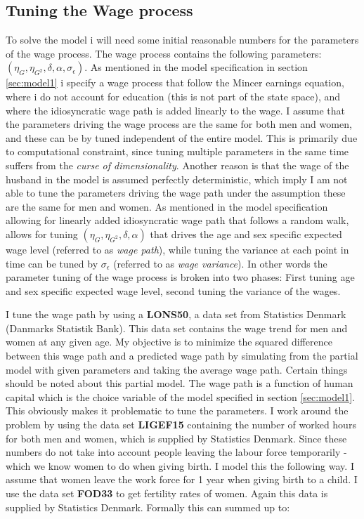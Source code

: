 \subsection{Tuning the Wage process}

To solve the model i will need some initial reasonable numbers for the parameters of the wage process. The wage process contains the following parameters: $(\eta_G, \eta_{G^2}, \delta, \alpha, \sigma_{\epsilon})$. As mentioned in the model specification in section \ref{sec:model1} i specify a wage process that follow the Mincer earnings equation, where i do not account for education (this is not part of the state space), and where the idiosyncratic wage path is added linearly to the wage. I assume that the parameters driving the wage process are the same for both men and women, and these can be by tuned independent of the entire model. This is primarily due to computational constraint, since tuning multiple parameters in the same time suffers from the \textit{curse of dimensionality}. Another reason is that the wage of the husband in the model is assumed perfectly deterministic, which imply I am not able to tune the parameters driving the wage path under the assumption these are the same for men and women. As mentioned in the model specification allowing for linearly added idiosyncratic wage path that follows a random walk, allows for tuning $(\eta_G, \eta_{G^2}, \delta, \alpha)$ that drives the age and sex specific expected wage level (referred to as \textit{wage path}), while tuning the variance at each point in time can be tuned by $\sigma_\epsilon$ (referred to as \textit{wage variance}). In other words the parameter tuning of the wage process is broken into two phases: First tuning age and sex specific expected wage level, second tuning the variance of the wages.

I tune the wage path by using a \textbf{LONS50}, a data set from Statistics Denmark (Danmarks Statistik Bank). This data set contains the wage trend for men and women at any given age. My objective is to minimize the squared difference between this wage path and a predicted wage path by simulating from the partial model with given parameters and taking the average wage path. Certain things should be noted about this partial model. The wage path is a function of human capital which is the choice variable of the model specified in section \ref{sec:model1}. This obviously makes it problematic to tune the parameters. I work around the problem by using the data set \textbf{LIGEF15} containing the number of worked hours for both men and women, which is supplied by Statistics Denmark. Since these numbers do not take into account people leaving the labour force temporarily - which we know women to do when giving birth. I model this the following way. I assume that women leave the work force for 1 year when giving birth to a child. I use the data set \textbf{FOD33} to get fertility rates of women. Again this data is supplied by Statistics Denmark. Formally this can summed up to:


